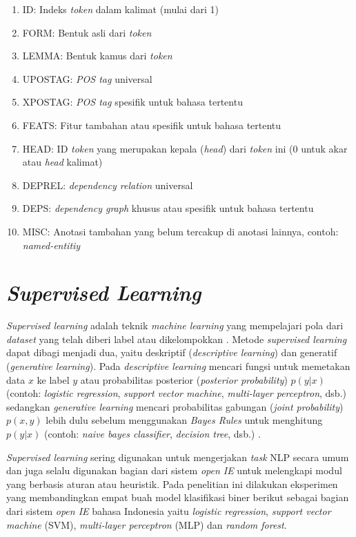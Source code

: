 \begin{enumerate}
	\item ID: Indeks \textit{token} dalam kalimat (mulai dari 1)
	\item FORM: Bentuk asli dari \textit{token}
	\item LEMMA: Bentuk kamus dari \textit{token}
	\item UPOSTAG: \textit{POS tag} universal
	\item XPOSTAG: \textit{POS tag} spesifik untuk bahasa tertentu
	\item FEATS: Fitur tambahan atau spesifik untuk bahasa tertentu
	\item HEAD: ID \textit{token} yang merupakan kepala (\textit{head}) dari \textit{token} ini (0 untuk akar atau \textit{head} kalimat)
	\item DEPREL: \textit{dependency relation} universal
	\item DEPS: \textit{dependency graph} khusus atau spesifik untuk bahasa tertentu
	\item MISC: Anotasi tambahan yang belum tercakup di anotasi lainnya, contoh: \textit{named-entitiy}
\end{enumerate}

\section{\textit{Supervised Learning}}

\textit{Supervised learning} adalah teknik \textit{machine learning} yang mempelajari pola dari \textit{dataset} yang telah diberi label atau dikelompokkan \citep{mohri2012foundations}. Metode \textit{supervised learning} dapat dibagi menjadi dua, yaitu deskriptif (\textit{descriptive learning}) dan generatif (\textit{generative learning}). Pada \textit{descriptive learning} mencari fungsi untuk memetakan data $x$ ke label $y$ atau probabilitas posterior (\textit{posterior probability}) $p(y|x)$ (contoh: \textit{logistic regression}, \textit{support vector machine}, \textit{multi-layer perceptron}, dsb.) sedangkan \textit{generative learning} mencari probabilitas gabungan (\textit{joint probability}) $p(x,y)$ lebih dulu sebelum menggunakan \textit{Bayes Rules} untuk menghitung $p(y|x)$ (contoh: \textit{naive bayes classifier}, \textit{decision tree}, dsb.) \citep{ng2002discriminative}. 

\textit{Supervised learning} sering digunakan untuk mengerjakan \textit{task} NLP secara umum dan juga selalu digunakan bagian dari sistem \textit{open IE} untuk melengkapi modul yang berbasis aturan atau heuristik. Pada penelitian ini dilakukan eksperimen yang membandingkan empat buah model klasifikasi biner berikut sebagai bagian dari sistem \textit{open IE} bahasa Indonesia yaitu \textit{logistic regression}, \textit{support vector machine} (SVM), \textit{multi-layer perceptron} (MLP) dan \textit{random forest}.

